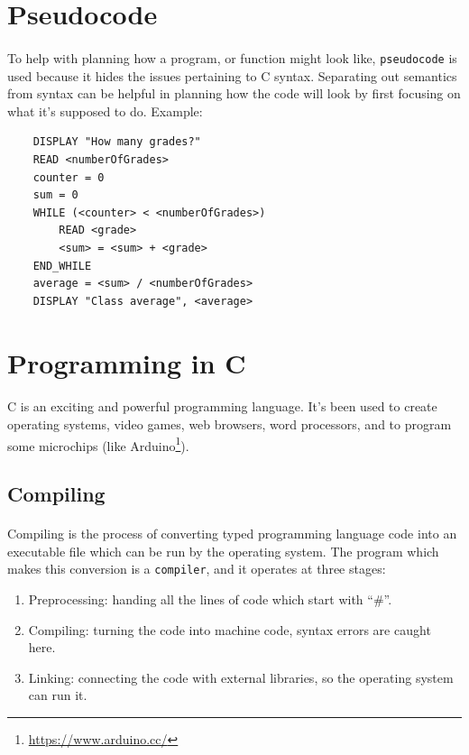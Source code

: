 \documentclass[letter,11pt]{article}
\begin{document}
\section{Pseudocode}
\paragraph{}To help with planning how a program, or function might look like, \texttt{pseudocode} is used because it hides the issues pertaining to C syntax. Separating out semantics from syntax can be helpful in planning how the code will look by first focusing on what it's supposed to do. Example:

\begin{verbatim}
    DISPLAY "How many grades?"
    READ <numberOfGrades>
    counter = 0
    sum = 0
    WHILE (<counter> < <numberOfGrades>)
        READ <grade>
        <sum> = <sum> + <grade>
    END_WHILE
    average = <sum> / <numberOfGrades>
    DISPLAY "Class average", <average>
\end{verbatim}

\section{Programming in C}
\paragraph{}C is an exciting and powerful programming language. It's been used to create operating systems, video games, web browsers, word processors, and to program some microchips (like Arduino\footnote{\url{https://www.arduino.cc/}}).

\subsection{Compiling}
\paragraph{}Compiling is the process of converting typed programming language code into an executable file which can be run by the operating system. The program which makes this conversion is a \texttt{compiler}, and it operates at three stages:
\begin{enumerate}
    \item Preprocessing: handing all the lines of code which start with ``\#''.
    \item Compiling: turning the code into machine code, syntax errors are caught here.
    \item Linking: connecting the code with external libraries, so the operating system can run it.
\end{enumerate}
\end{document}
